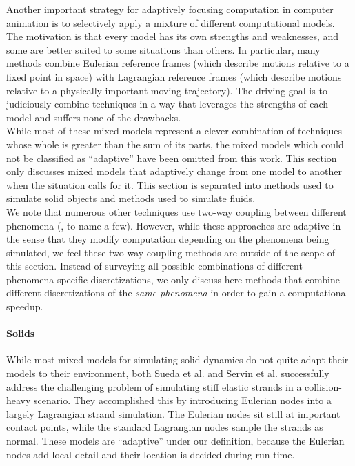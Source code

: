 Another important strategy for adaptively focusing computation in computer animation is to selectively apply a mixture of different computational models. The motivation is that every model has its own strengths and weaknesses, and some are better suited to some situations than others. In particular, many methods combine Eulerian reference frames (which describe motions relative to a fixed point in space) with Lagrangian reference frames (which describe motions relative to a physically important moving trajectory). The driving goal is to judiciously combine techniques in a way that leverages the strengths of each model and suffers none of the drawbacks.
\\
While most of these mixed models represent a clever combination of techniques whose whole is greater than the sum of its parts, the mixed models which could not be classified as ``adaptive'' have been omitted from this work. This section only discusses mixed models that adaptively change from one model to another when the situation calls for it.
This section is separated into methods used to simulate solid objects and methods used to simulate fluids.
\\
We note that numerous other techniques use two-way coupling between different phenomena (\hspace{1sp}\cite{carlson2004rigid,robinson2008two,shinar2008two,Remillard2013}, to name a few). However, while these approaches are adaptive in the sense that they modify computation depending on the phenomena being simulated, we feel these two-way coupling methods are outside of the scope of this section. Instead of surveying all possible combinations of different phenomena-specific discretizations, we only discuss here methods that combine different discretizations of the {\em same phenomena} in order to gain a computational speedup.

\paragraph{Solids}
While most mixed models for simulating solid dynamics do not quite adapt their models to their environment, both Sueda et al. \cite{Sueda2011} and Servin et al. \cite{Servin2011} successfully address the challenging problem of simulating stiff elastic strands in a collision-heavy scenario. They accomplished this by introducing Eulerian nodes into a largely Lagrangian strand simulation. The Eulerian nodes sit still at important contact points, while the standard Lagrangian nodes sample the strands as normal. These models are ``adaptive'' under our definition, because the Eulerian nodes add local detail and their location is decided during run-time.


